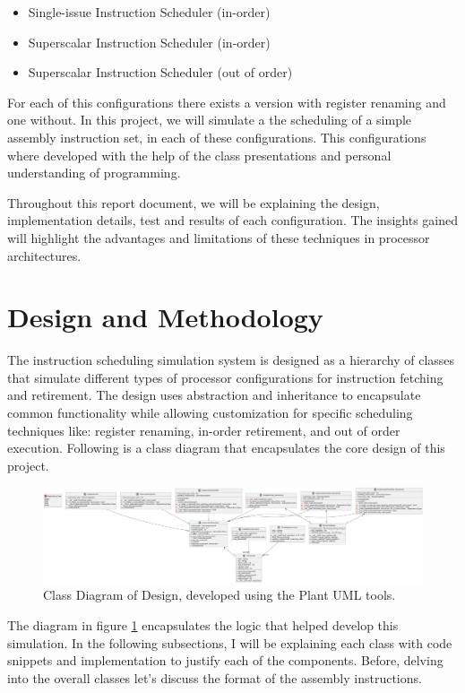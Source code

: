 \documentclass{article}
\begin{document}
\begin{itemize}
    \item Single-issue Instruction Scheduler (in-order)
    \item Superscalar Instruction Scheduler (in-order)
    \item Superscalar Instruction Scheduler (out of order) 
\end{itemize}

For each of this configurations there exists a version with register renaming and one without. In this project, we will simulate a the scheduling of a simple assembly instruction set, in each of these configurations. This configurations where developed with the help of the class presentations and personal understanding of programming.

Throughout this report document, we will be explaining the design, implementation details, test and results of each configuration. The insights gained will highlight the advantages and limitations of these techniques in processor architectures. 

\section{Design and Methodology}
The instruction scheduling simulation system is designed as a hierarchy of classes that simulate different types of processor configurations for instruction fetching and retirement. The design uses abstraction and inheritance to encapsulate common functionality while allowing customization for specific scheduling techniques like: register renaming, in-order retirement, and out of order execution. Following is a class diagram that encapsulates the core design of this project.

\begin{figure}[H]
    \centering
    \includegraphics[width=1\textwidth]{ClassDiagram.png}  
    \caption{Class Diagram of Design, developed using the Plant UML tools.}  
    \label{fig:ClassDiagram}
\end{figure}

The diagram in figure \ref{fig:ClassDiagram} encapsulates the logic that helped develop this simulation. In the following subsections, I will be explaining each class with code snippets and implementation to justify each of the components. Before, delving into the overall classes let's discuss the format of the assembly instructions. 
\end{document}
